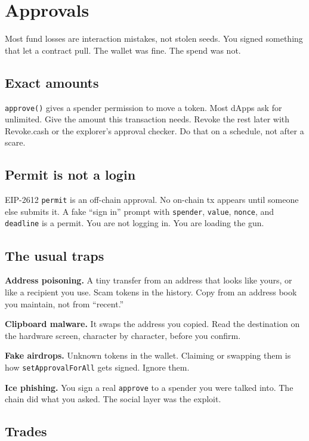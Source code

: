 \chapter{Approvals}

Most fund losses are interaction mistakes, not stolen
seeds. You signed something that let a contract pull.
The wallet was fine. The spend was not.

\section{Exact amounts}

\texttt{approve()} gives a spender permission to move a
token. Most dApps ask for unlimited. Give the amount
this transaction needs. Revoke the rest later with
Revoke.cash or the explorer's approval checker. Do that
on a schedule, not after a scare.

\section{Permit is not a login}

EIP-2612 \texttt{permit} is an off-chain approval. No
on-chain tx appears until someone else submits it. A
fake ``sign in'' prompt with \texttt{spender},
\texttt{value}, \texttt{nonce}, and \texttt{deadline} is
a permit. You are not logging in. You are loading the
gun.

\section{The usual traps}

\textbf{Address poisoning.} A tiny transfer from an
address that looks like yours, or like a recipient you
use. Scam tokens in the history. Copy from an address
book you maintain, not from ``recent.''

\textbf{Clipboard malware.} It swaps the address you
copied. Read the destination on the hardware screen,
character by character, before you confirm.

\textbf{Fake airdrops.} Unknown tokens in the wallet.
Claiming or swapping them is how
\texttt{setApprovalForAll} gets signed. Ignore them.

\textbf{Ice phishing.} You sign a real \texttt{approve}
to a spender you were talked into. The chain did what
you asked. The social layer was the exploit.

\section{Trades}


